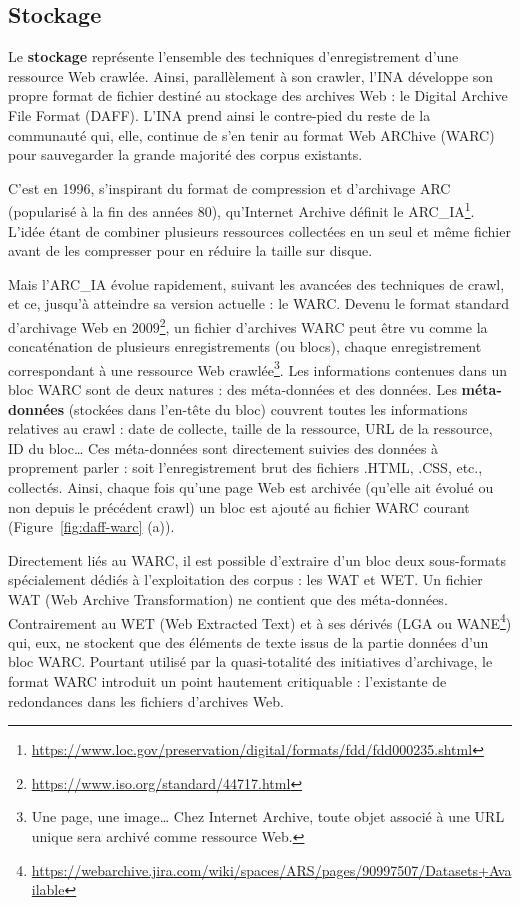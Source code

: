\documentclass[symmetric,justified,marginals=raggedouter]{tufte-book}
\begin{document}
\subsection{Stockage}

\noindent Le \textbf{stockage} représente l'ensemble des techniques d'enregistrement d'une ressource Web crawlée. Ainsi, parallèlement à son crawler, l'INA développe son propre format de fichier destiné au stockage des archives Web : le Digital Archive File Format (DAFF). L'INA prend ainsi le contre-pied du reste de la communauté qui, elle, continue de s'en tenir au format Web ARChive (WARC) pour sauvegarder la grande majorité des corpus existants.

C'est en 1996, s'inspirant du format de compression et d'archivage ARC (popularisé à la fin des années 80), qu'Internet Archive définit le ARC\_IA\footnote{\RaggedOuter \url{https://www.loc.gov/preservation/digital/formats/fdd/fdd000235.shtml}}. L'idée étant de combiner plusieurs ressources collectées en un seul et même fichier avant de les compresser pour en réduire la taille sur disque.

Mais l'ARC\_IA évolue rapidement, suivant les avancées des techniques de crawl, et ce, jusqu'à atteindre sa version actuelle : le WARC. Devenu le format standard d'archivage Web en 2009\footnote{\RaggedOuter \url{https://www.iso.org/standard/44717.html}}, un fichier d'ar\-chives WARC peut être vu comme la concaténation de plusieurs enregistrements (ou blocs), chaque enregistrement correspondant à une ressource Web crawlée\footnote{\RaggedOuter Une page, une image\ldots{} Chez Internet Archive, toute objet associé à une URL unique sera archivé comme ressource Web.}. Les informations contenues dans un bloc WARC sont de deux natures : des méta-données et des données. Les \textbf{méta-données} (stockées dans l'en-tête du bloc) couvrent toutes les informations relatives au crawl : date de collecte, taille de la ressource, URL de la ressource, ID du bloc\ldots{} Ces méta-données sont directement suivies des données à proprement parler : soit l'enregistrement brut des fichiers .HTML, .CSS, etc., collectés. Ainsi, chaque fois qu'une page Web est archivée (qu'elle ait évolué ou non depuis le précédent crawl) un bloc est ajouté au fichier WARC courant (Figure~\ref{fig:daff-warc} (a)). 

Directement liés au WARC, il est possible d'extraire d'un bloc deux sous-formats spécialement dédiés à l'exploitation des corpus : les WAT et WET. Un fichier WAT (Web Archive Transformation) ne contient que des méta-données. Contrairement au WET (Web Extracted Text) et à ses dérivés (LGA ou WANE\footnote{\RaggedOuter \url{https://webarchive.jira.com/wiki/spaces/ARS/pages/90997507/Datasets+Available}}) qui, eux, ne stockent que des éléments de texte issus de la partie données d'un bloc WARC. Pourtant utilisé par la quasi-totalité des initiatives d'archivage, le format WARC introduit un point hautement critiquable : l'existante de redondances dans les fichiers d'archives Web.
\end{document}
